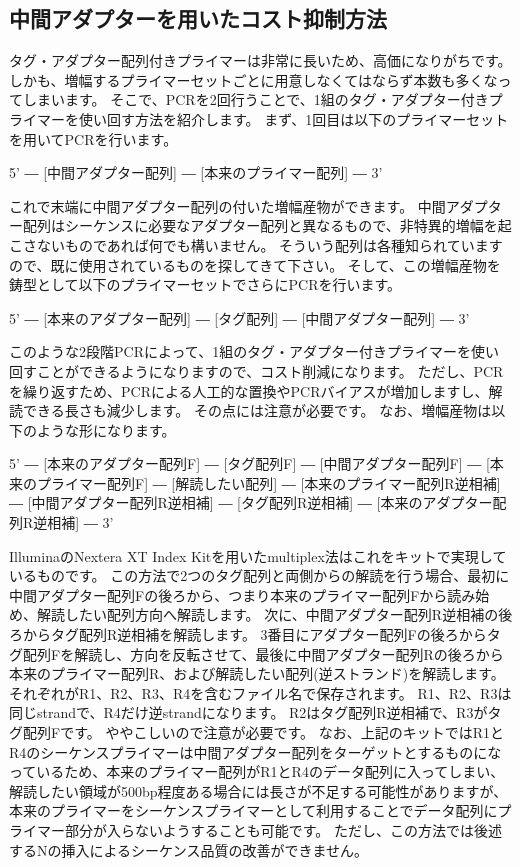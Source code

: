 \documentclass[titlepage,10pt,a4paper]{jsbook}
\newenvironment{pre}{\begin{leftbar}\raggedright\ttfamily\footnotesize\setlength{\baselineskip}{1.4em}}{\end{leftbar}\vspace{-1em}}
\begin{document}
\subsection{中間アダプターを用いたコスト抑制方法}\label{subsection:interimadapter}

タグ・アダプター配列付きプライマーは非常に長いため、高価になりがちです。
しかも、増幅するプライマーセットごとに用意しなくてはならず本数も多くなってしまいます。
そこで、PCRを2回行うことで、1組のタグ・アダプター付きプライマーを使い回す方法を紹介します。
まず、1回目は以下のプライマーセットを用いてPCRを行います。

\begin{pre}
5' ― [中間アダプター配列] ― [本来のプライマー配列] ― 3'
\end{pre}

これで末端に中間アダプター配列の付いた増幅産物ができます。
中間アダプター配列はシーケンスに必要なアダプター配列と異なるもので、非特異的増幅を起こさないものであれば何でも構いません。
そういう配列は各種知られていますので、既に使用されているものを探してきて下さい。
そして、この増幅産物を鋳型として以下のプライマーセットでさらにPCRを行います。

\begin{pre}
5' ― [本来のアダプター配列] ― [タグ配列] ― [中間アダプター配列] ― 3'
\end{pre}

このような2段階PCRによって、1組のタグ・アダプター付きプライマーを使い回すことができるようになりますので、コスト削減になります。
ただし、PCRを繰り返すため、PCRによる人工的な置換やPCRバイアスが増加しますし、解読できる長さも減少します。
その点には注意が必要です。
なお、増幅産物は以下のような形になります。

\begin{pre}
5' ― [本来のアダプター配列F] ― [タグ配列F] ― [中間アダプター配列F] ― [本来のプライマー配列F] ― [解読したい配列] ― [本来のプライマー配列R逆相補] ― [中間アダプター配列R逆相補] ― [タグ配列R逆相補] ― [本来のアダプター配列R逆相補] ― 3'
\end{pre}

IlluminaのNextera XT Index Kitを用いたmultiplex法\citep{Illumina2013}はこれをキットで実現しているものです。
この方法で2つのタグ配列と両側からの解読を行う場合、最初に中間アダプター配列Fの後ろから、つまり本来のプライマー配列Fから読み始め、解読したい配列方向へ解読します。
次に、中間アダプター配列R逆相補の後ろからタグ配列R逆相補を解読します。
3番目にアダプター配列Fの後ろからタグ配列Fを解読し、方向を反転させて、最後に中間アダプター配列Rの後ろから本来のプライマー配列R、および解読したい配列(逆ストランド)を解読します。
それぞれがR1、R2、R3、R4を含むファイル名で保存されます。
R1、R2、R3は同じstrandで、R4だけ逆strandになります。
R2はタグ配列R逆相補で、R3がタグ配列Fです。
ややこしいので注意が必要です。
なお、上記のキットではR1とR4のシーケンスプライマーは中間アダプター配列をターゲットとするものになっているため、本来のプライマー配列がR1とR4のデータ配列に入ってしまい、解読したい領域が500bp程度ある場合には長さが不足する可能性がありますが、本来のプライマーをシーケンスプライマーとして利用することでデータ配列にプライマー部分が入らないようすることも可能です。
ただし、この方法では後述するNの挿入によるシーケンス品質の改善ができません。
\end{document}
